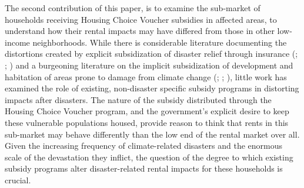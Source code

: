 \documentclass[12pt]{article}
\begin{document}

The second contribution of this paper, is to examine the sub-market of households receiving Housing Choice Voucher subsidies in affected areas, to understand how their rental impacts may have differed from those in other low-income neighborhoods.  While there is considerable literature documenting the distortions created by explicit subsidization of disaster relief through insurance (\cite{kousky_learning_2010}; \cite{gregory_impact_2017}; \cite{gallagher_learning_2014}) and a burgeoning literature on the implicit subsidization of development and habitation of areas prone to damage from climate change (\cite{ostriker_effects_2022}; \cite{baylis_moral_2019}; \cite{wagner_adaptation_2022}), little work has examined the role of existing, non-disaster specific subsidy programs in distorting impacts after disasters. The nature of the subsidy distributed through the Housing Choice Voucher program, and the government's explicit desire to keep these vulnerable populations housed, provide reason to think that rents in this sub-market may behave differently than the low end of the rental market over all. Given the increasing frequency of climate-related disasters and the enormous scale of the devastation they inflict, the question of the degree to which existing subsidy programs alter disaster-related rental impacts for these households is crucial. 
\end{document}
